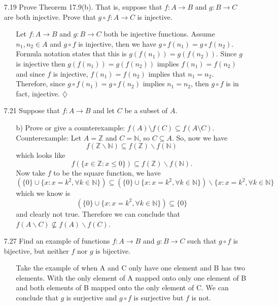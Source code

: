 \documentclass[12pt]{article}
\begin{document}
\begin{enumerate}
\item[7.19] Prove Theorem 17.9(b). That is, suppose that $f: A \rightarrow B$ and $g: B \rightarrow C$ are both injective. Prove that $g \circ f: A \rightarrow C$ is injective.
\begin{enumerate}
\item[] Let $f: A \rightarrow B$ and $g: B \rightarrow C$ both be injective functions. Assume $n_1, n_2
\in A$ and $g \circ f$ is injective, then we have $g \circ f(n_1) = g \circ f(n_2)$.
Formula notation states that this is $g(f(n_1)) = g(f(n_2))$. Since $g$ is injective then 
$g(f(n_1)) = g(f(n_2))$ implies $f(n_1) = f(n_2)$ and since $f$ is injective, $f(n_1) = f(n_2)$ implies
that $n_1 = n_2$. Therefore, since $g \circ f(n_1) = g \circ f(n_2)$ implies $n_1 = n_2$, then
$g \circ f$ is in fact, injective. $\diamondsuit$
\end{enumerate}

\item[7.21] Suppose that $f: A \rightarrow B$ and let $C$ be a subset of $A$.
\begin{enumerate}
\item[b)] Prove or give a counterexample: $f(A)\setminus f(C) \subseteq f(A\setminus C)$.
Counterexample: Let $A = \mathbb{Z}$ and $C = \mathbb{N}$, so $C \subseteq A$. So, now we
have \[
f(\mathbb{Z}\backslash \mathbb{N}) \subseteq f(\mathbb{Z})\backslash f(\mathbb{N})
\] which looks like \[
f(\{x \in \mathbb{Z}: x \leq 0\}) \subseteq f(\mathbb{Z})\backslash f(\mathbb{N}).
\] Now take $f$ to be the square function, we have \[
(\{0\} \cup \{x: x = k^2, \forall k \in \mathbb{N}\})
\subseteq 
(\{0\} \cup \{x: x = k^2, \forall k \in \mathbb{N}\})
\backslash 
\{x: x = k^2, \forall k \in \mathbb{N}\}
\] which we know is \[
(\{0\} \cup \{x: x = k^2, \forall k \in \mathbb{N}\})
\subseteq \{0\} \] and clearly not true. Therefore we can conclude that 
$f(A\backslash C) \not\subseteq f(A)\backslash f(C)$.
\end{enumerate}

\item[7.27] Find an example of functions $f: A \rightarrow B$ and $g: B \rightarrow C$ such that $g \circ f$ is bijective, but neither $f$ nor $g$ is bijective.
\begin{enumerate}
\item[]
Take the example of when A and C only have one element and B has two elements. With the only element of A mapped onto only one element of B and both elements of B mapped onto the only element of C. We can conclude that $g$ is surjective and $g \circ f$ is surjective but $f$ is not.
\end{enumerate}


\end{enumerate}
\end{document}
